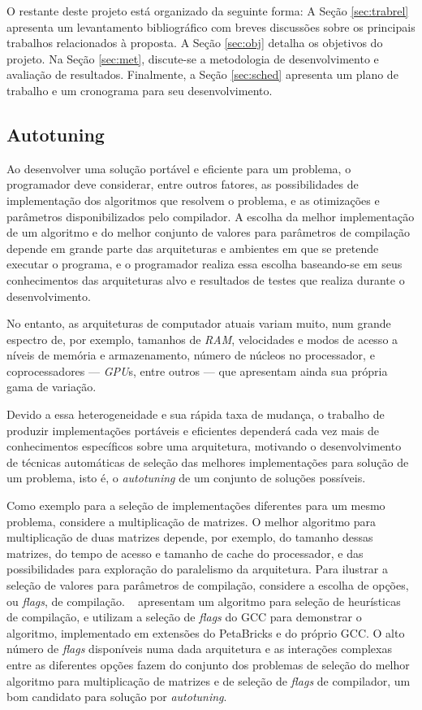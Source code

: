 \documentclass[a4paper, 11pt]{article}
\begin{document}
O restante deste projeto está organizado da seguinte forma: 
A Seção \ref{sec:trabrel} apresenta um levantamento bibliográfico com breves
discussões sobre os principais trabalhos relacionados à proposta.
A Seção \ref{sec:obj} detalha os objetivos do projeto. Na Seção 
\ref{sec:met}, discute-se a metodologia de desenvolvimento e avaliação de 
resultados. Finalmente, a Seção \ref{sec:sched} apresenta um plano de trabalho
e um cronograma para seu desenvolvimento. 

\subsection{Autotuning} \label{sec:autotuning}

Ao desenvolver uma solução portável e eficiente para um problema, o
programador deve considerar, entre outros fatores, as possibilidades
de implementação dos algoritmos que resolvem o problema, e as otimizações e 
parâmetros disponibilizados pelo compilador.
A escolha da melhor implementação de um algoritmo e do melhor conjunto de 
valores para parâmetros de compilação depende em grande parte das arquiteturas 
e ambientes em que se pretende executar o programa, e o programador realiza 
essa escolha baseando-se em seus conhecimentos das arquiteturas alvo e 
resultados de testes que realiza durante o desenvolvimento.

No entanto, as arquiteturas de computador atuais variam muito, num grande 
espectro de, por exemplo, tamanhos de \emph{RAM},
velocidades e modos de acesso a níveis de memória e armazenamento, número de 
núcleos no processador, e coprocessadores --- \emph{GPU}s, entre outros 
--- que apresentam ainda sua própria gama de variação.

Devido a essa heterogeneidade e sua rápida taxa de mudança, 
o trabalho de produzir implementações portáveis e eficientes 
dependerá cada vez mais de conhecimentos específicos sobre uma arquitetura,
motivando o desenvolvimento de técnicas automáticas de seleção das melhores
implementações para solução de um problema, isto é, o \emph{autotuning} de um
conjunto de soluções possíveis.

Como exemplo para a seleção de implementações diferentes para um mesmo
problema, considere a multiplicação de matrizes. O melhor algoritmo
para multiplicação de duas matrizes depende, por exemplo, do tamanho dessas
matrizes, do tempo de acesso e tamanho de cache do processador, e das 
possibilidades para exploração do paralelismo da arquitetura.
Para ilustrar a seleção de valores para parâmetros de compilação, considere
a escolha de opções, ou \emph{flags}, de compilação.
~\citet{tartara2013heuristics} apresentam um algoritmo para seleção de 
heurísticas de compilação, e utilizam a seleção de \emph{flags}
do GCC para demonstrar o algoritmo, implementado em extensões do PetaBricks e 
do próprio GCC. 
O alto número de \emph{flags} disponíveis numa dada arquitetura e as interações
complexas entre as diferentes opções fazem do conjunto dos problemas de 
seleção do melhor algoritmo para multiplicação de matrizes e de seleção de 
\emph{flags} de compilador, um bom candidato para solução por 
\emph{autotuning}.
\end{document}
